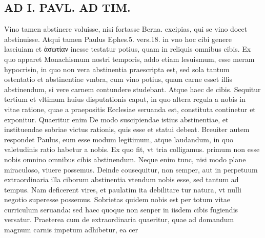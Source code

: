 \documentclass{article}
\begin{document}
\begin{pages}
\section*{AD I. PAVL. AD TIM. }
\marginpar{[ p.300 ]}\pstart Vino tamen abstinere voluisse, nisi fortasse Berna. excipias, qui se vino docet abstinuisse. Atqui tamen Paulus Ephes.5. vers.18. in vno hoc cibi genere lasciuiam et ἀσωτίαν inesse testatur potius, quam in reliquis omnibus cibis. Ex quo apparet Monachismum nostri temporis, addo etiam lesuismum, esse meram hypocrisin, in quo non vera abstinentia praescripta est, sed sola tantum ostentatio et abstinentiae vmbra, cum vino potius, quam carne esset illis abstinendum, si vere carnem contundere studebant. Atque haec de cibis. Sequitur tertium et vltimum huius disputationis caput, in quo altera regula a nobis in vitae ratione, quae a praepositis Ecclesiae seruanda est, constituta continetur et exponitur. Quaeritur enim De modo suscipiendae istius abstinentiae, et instituendae sobriae victus rationis, quis esse et statui debeat. Breuiter autem respondet Paulus, eum esse modum legitimum, atque laudandum, in quo valetudinis ratio habetur a nobis. Ex quo fit, vt tria colligamus. primum non esse nobis omnino omnibus cibis abstinendum. Neque enim tunc, nisi modo plane miraculoso, viuere possemus. Deinde cousequitur, non semper, aut in perpetuum extraordinaria illa ciborum abstinentia vtendum nobis esse, sed tantum ad tempus. Nam deficerent vires, et paulatim ita debilitare tur natura, vt nulli negotio superesse possemus. Sobrietas quidem nobis est per totum vitae curriculum seruanda: sed haec quoque non senper in iisdem cibis fugiendis versatur. Praeterea cum de extraordinaria quaeritur, quae ad domandum magnum carnis impetum adhibetur, ea cer\pend

\end{pages}
\end{document}
